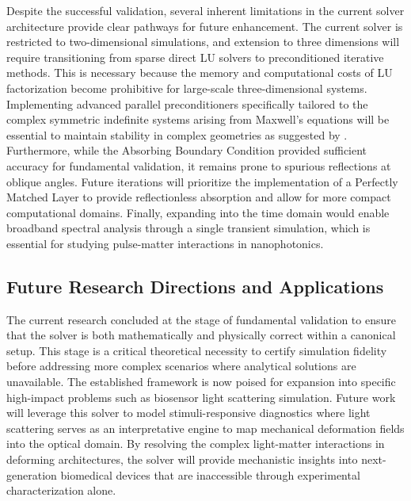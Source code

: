 \documentclass[class=report, crop=false]{standalone}
\begin{document}
Despite the successful validation, several inherent limitations in the current solver architecture provide clear pathways for future enhancement. The current solver is restricted to two-dimensional simulations, and extension to three dimensions will require transitioning from sparse direct LU solvers to preconditioned iterative methods. This is necessary because the memory and computational costs of LU factorization become prohibitive for large-scale three-dimensional systems. Implementing advanced parallel preconditioners specifically tailored to the complex symmetric indefinite systems arising from Maxwell's equations will be essential to maintain stability in complex geometries as suggested by \citet{Owusu-Agyemang2025}. Furthermore, while the Absorbing Boundary Condition provided sufficient accuracy for fundamental validation, it remains prone to spurious reflections at oblique angles. Future iterations will prioritize the implementation of a Perfectly Matched Layer to provide reflectionless absorption and allow for more compact computational domains. Finally, expanding into the time domain would enable broadband spectral analysis through a single transient simulation, which is essential for studying pulse-matter interactions in nanophotonics.

\subsection{Future Research Directions and Applications}

The current research concluded at the stage of fundamental validation to ensure that the solver is both mathematically and physically correct within a canonical setup. This stage is a critical theoretical necessity to certify simulation fidelity before addressing more complex scenarios where analytical solutions are unavailable. The established framework is now poised for expansion into specific high-impact problems such as biosensor light scattering simulation. Future work will leverage this solver to model stimuli-responsive diagnostics where light scattering serves as an interpretative engine to map mechanical deformation fields into the optical domain. By resolving the complex light-matter interactions in deforming architectures, the solver will provide mechanistic insights into next-generation biomedical devices that are inaccessible through experimental characterization alone.
\end{document}
